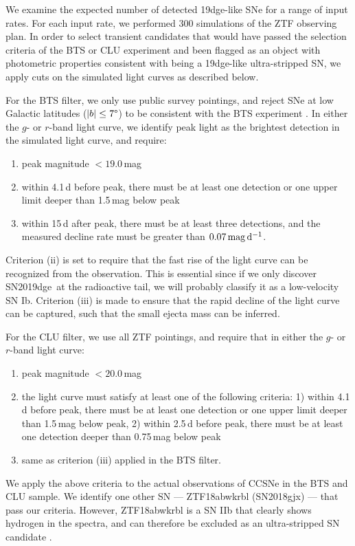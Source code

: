 \documentclass[twocolumn]{aastex63}
\newcommand{\name}{SN2019dge}
\begin{document}
We examine the expected number of detected 19dge-like SNe for a range of input rates. For each input 
rate, we performed 300 simulations of the ZTF observing plan. In order to select transient candidates 
that would have passed the selection criteria of the BTS or CLU experiment and been flagged as an 
object with photometric properties consistent with being a 19dge-like ultra-stripped SN, we apply cuts 
on the simulated light curves as described below.

For the BTS filter, we only use public survey pointings, and reject SNe at low Galactic latitudes ($|b|\leq 
7 \degree$) to be consistent with the BTS experiment \citep{FremlingBTS2019}. In either the $g$- or 
$r$-band light curve, we identify peak light as the brightest detection in the simulated light curve, and 
require:
\begin{enumerate}[label=(\roman*)]
	\item peak magnitude $<19.0$\,mag 
	\item within 4.1\,d before peak, there must be at least one detection or one upper limit 
	deeper than 1.5\,mag below peak
	\item within 15\,d after peak, there must be at least three detections, and the measured decline rate 
	must be greater than $0.07\,{\rm mag\,d^{-1}}$.
\end{enumerate}
Criterion (ii) is set to require that the fast rise of the light curve can be recognized from the 
observation. This is essential since if we only discover \name\ at the radioactive tail, we will 
probably classify it as a low-velocity SN Ib. Criterion (iii) is 
made to ensure that the rapid decline of the light curve can be captured, such that the small ejecta 
mass can be inferred.

For the CLU filter, we use all ZTF pointings, and require that in either the $g$- or $r$-band light curve:
\begin{enumerate}[label=(\roman*)]
	\item peak magnitude $<20.0$\,mag 
	\item the light curve must satisfy at least one of the following criteria: 1) within 4.1\,d before peak, 
	there must be at least one detection or one upper limit deeper than 1.5\,mag below peak, 
	2) within 2.5\,d before peak, there must be at least one detection deeper than 0.75\,mag below 
	peak
	\item same as criterion (iii) applied in the BTS filter.
\end{enumerate}
We apply the above criteria to the actual observations of CCSNe in the BTS and CLU sample. We 
identify one other SN --- ZTF18abwkrbl (SN2018gjx) --- that pass our criteria. However, ZTF18abwkrbl 
is a SN IIb that clearly shows hydrogen in the spectra, and can therefore be excluded as an 
ultra-stripped SN candidate \citep{Tauris2015}. 
\end{document}
